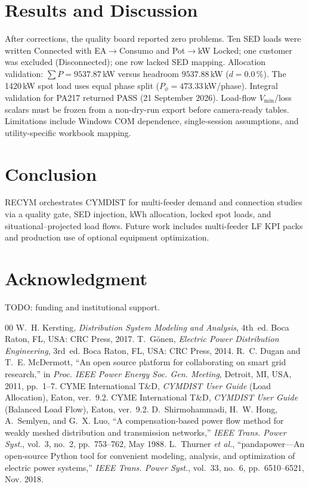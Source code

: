 \documentclass[journal]{IEEEtran}
\begin{document}
\section{Results and Discussion}
After corrections, the quality board reported zero problems.
Ten SED loads were written Connected with EA$\to$Consumo and Pot$\to$kW Locked;
one customer was excluded (Disconnected); one row lacked SED mapping.
Allocation validation: $\sum P=9537.87$\,kW versus headroom $9537.88$\,kW
($d=0.0$\,\%).
The 1420\,kW spot load uses equal phase split
($P_{\phi}=473.33$\,kW/phase).
Integral validation for PA217 returned PASS (21 September 2026).
Load-flow $V_{\min}$/loss scalars must be frozen from a non-dry-run export
before camera-ready tables.
Limitations include Windows COM dependence, single-session assumptions, and
utility-specific workbook mapping.

\section{Conclusion}
RECYM orchestrates CYMDIST for multi-feeder demand and connection studies via a
quality gate, SED injection, kWh allocation, locked spot loads, and
situational--projected load flows.
Future work includes multi-feeder LF KPI packs and production use of optional
equipment optimization.

\section*{Acknowledgment}
TODO: funding and institutional support.

\begin{thebibliography}{00}
 W.~H. Kersting, \emph{Distribution System Modeling and Analysis}, 4th~ed. Boca Raton, FL, USA: CRC Press, 2017.
 T.~G\"onen, \emph{Electric Power Distribution Engineering}, 3rd~ed. Boca Raton, FL, USA: CRC Press, 2014.
 R.~C. Dugan and T.~E. McDermott, ``An open source platform for collaborating on smart grid research,'' in \emph{Proc. IEEE Power Energy Soc. Gen. Meeting}, Detroit, MI, USA, 2011, pp.~1--7.
 CYME International T\&D, \emph{CYMDIST User Guide} (Load Allocation), Eaton, ver.~9.2.
 CYME International T\&D, \emph{CYMDIST User Guide} (Balanced Load Flow), Eaton, ver.~9.2.
 D.~Shirmohammadi, H.~W. Hong, A.~Semlyen, and G.~X. Luo, ``A compensation-based power flow method for weakly meshed distribution and transmission networks,'' \emph{IEEE Trans. Power Syst.}, vol.~3, no.~2, pp.~753--762, May 1988.
 L.~Thurner \emph{et al.}, ``pandapower---An open-source Python tool for convenient modeling, analysis, and optimization of electric power systems,'' \emph{IEEE Trans. Power Syst.}, vol.~33, no.~6, pp.~6510--6521, Nov. 2018.
\end{thebibliography}
\end{document}
